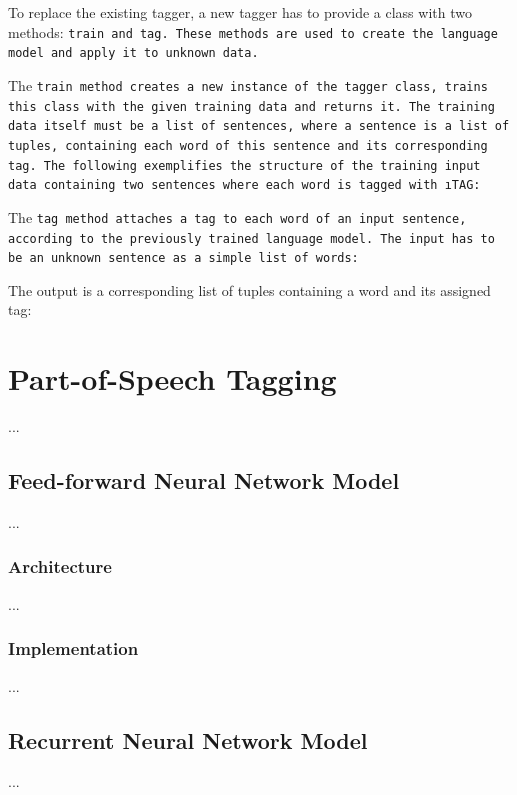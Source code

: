 To replace the existing tagger, a new tagger has to provide a class with two methods: \tt{train} and \tt{tag}. These methods are used to create the language model and apply it to unknown data.

The \tt{train} method creates a new instance of the tagger class, trains this class with the given training data and returns it. The training data itself must be a list of sentences, where a sentence is a list of tuples, containing each word of this sentence and its corresponding tag. The following exemplifies the structure of the training input data containing two sentences where each word is tagged with \i{TAG}:



The \tt{tag} method attaches a tag to each word of an input sentence, according to the previously trained language model. The input has to be an unknown sentence as a simple list of words:



The output is a corresponding list of tuples containing a word and its assigned tag:




\chapter{Part-of-Speech Tagging}\label{c.postagging}
...

\section{Feed-forward Neural Network Model}\label{c.postagging.fnn}
...

\subsection{Architecture}\label{c.postagging.fnn.architecture}
...

\subsection{Implementation}\label{c.postagging.fnn.implementation}
...

\section{Recurrent Neural Network Model}\label{c.postagging.rnn}
...

